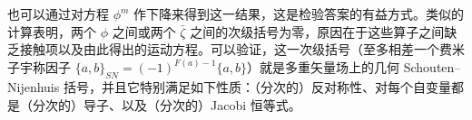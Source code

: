 也可以通过对方程 $\phi^m$ 作下降来得到这一结果，这是检验答案的有益方式。类似的计算表明，两个 $\phi$ 之间或两个 $\bar\zeta$ 之间的次级括号为零，原因在于这些算子之间缺乏接触项以及由此得出的运动方程。可以验证，这一次级括号（至多相差一个费米子宇称因子 $\{a,b\}_{SN} = (-1)^{F(a)-1}\{a,b\}$）就是多重矢量场上的几何 Schouten--Nijenhuis 括号，并且它特别满足如下性质：（分次的）反对称性、对每个自变量都是（分次的）导子、以及（分次的）Jacobi 恒等式。
